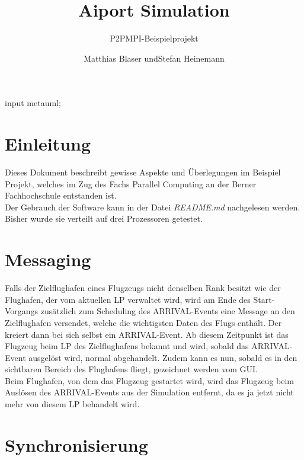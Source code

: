 \documentclass[oneside,DIV12,BCOR0.5cm,bibliography=totoc]{template}
\begin{document}
\begin{empfile}
\begin{empcmds}
input metauml;
\end{empcmds}


\title{Aiport Simulation}
\subtitle{P2PMPI-Beispielprojekt}

\author{Matthias Blaser undStefan Heinemann }

\maketitle


\section{Einleitung}

Dieses Dokument beschreibt gewisse Aspekte und Überlegungen im Beispiel
Projekt, welches im Zug des Fachs Parallel Computing an der Berner
Fachhochschule entstanden ist.\\

Der Gebrauch der Software kann in der Datei \emph{README.md} nachgelesen
werden. Bisher wurde sie verteilt auf drei Prozessoren getestet.

\section{Messaging}

Falls der Zielflughafen eines Flugzeugs nicht denselben Rank besitzt
wie der Flughafen, der vom aktuellen LP verwaltet wird, wird am Ende des
Start-Vorgangs zusätzlich zum Scheduling des ARRIVAL-Events eine Message
an den Zielflughafen versendet, welche die wichtigsten Daten des Flugs
enthält. Der kreiert dann bei sich selbst ein ARRIVAL-Event. Ab diesem
Zeitpunkt ist das Flugzeug beim LP des Zielflughafens bekannt und wird,
sobald das ARRIVAL-Event ausgelöst wird, normal abgehandelt. Zudem
kann es nun, sobald es in den sichtbaren Bereich des Flughafens fliegt,
gezeichnet werden vom GUI.\\

Beim Flughafen, von dem das Flugzeug gestartet wird, wird das Flugzeug
beim Auslösen des ARRIVAL-Events aus der Simulation entfernt, da es ja
jetzt nicht mehr von diesem LP behandelt wird.\\

\section{Synchronisierung}


\end{empfile}
\end{document}

